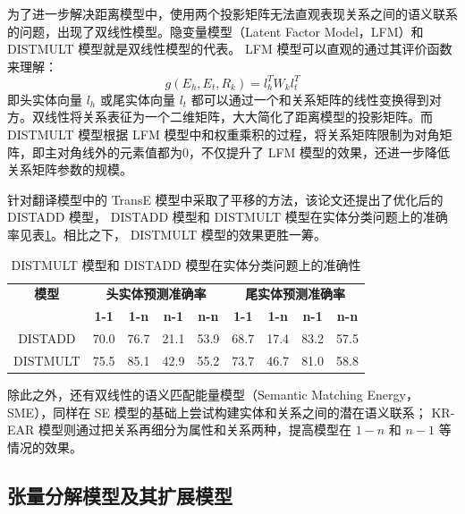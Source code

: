 \documentclass{llncs}
\begin{document}
为了进一步解决距离模型中，使用两个投影矩阵无法直观表现关系之间的语义联系的问题，出现了双线性模型。隐变量模型（Latent Factor Model，LFM）\cite{DBLP:conf/nips/JenattonRBO12}和 DISTMULT 模型\cite{DBLP:journals/corr/YangYHGD14a}就是双线性模型的代表。 LFM 模型可以直观的通过其评价函数来理解：
\begin{displaymath}
g(E_h,E_t,R_k)=l_h^TW_kl_t^T
\end{displaymath}
即头实体向量 $l_h$ 或尾实体向量 $l_t$ 都可以通过一个和关系矩阵的线性变换得到对方。双线性将关系表征为一个二维矩阵，大大简化了距离模型的投影矩阵。而 DISTMULT 模型根据 LFM 模型中和权重乘积的过程，将关系矩阵限制为对角矩阵，即主对角线外的元素值都为0，不仅提升了 LFM 模型的效果，还进一步降低关系矩阵参数的规模。

针对翻译模型中的 TransE 模型\cite{DBLP:conf/nips/BordesUGWY13}中采取了平移的方法，该论文还提出了优化后的 DISTADD 模型\cite{DBLP:journals/corr/YangYHGD14a}， DISTADD 模型和 DISTMULT 模型在实体分类问题上的准确率见表\ref{tb:DISTMULT&DISTADD}。相比之下， DISTMULT 模型的效果更胜一筹。

\begin{table}
	\centering
	\caption{ DISTMULT 模型和 DISTADD 模型在实体分类问题上的准确性}
	\label{tb:DISTMULT&DISTADD}
	\begin{threeparttable}
		\begin{tabular}{ccccccccc}
			\hline
			\textbf{模型} & \multicolumn{4}{c}{\textbf{头实体预测准确率}} & \multicolumn{4}{c}{\textbf{尾实体预测准确率}} \\
			\textbf{} & \textbf{1-1} & \textbf{1-n} & \textbf{n-1} & \textbf{n-n} & \textbf{1-1} & \textbf{1-n} & \textbf{n-1} & \textbf{n-n} \\ \hline
			DISTADD & 70.0 & 76.7 & 21.1 & 53.9 & 68.7 & 17.4 & 83.2 & 57.5 \\
			DISTMULT & 75.5 & 85.1 & 42.9 & 55.2 & 73.7 & 46.7 & 81.0 & 58.8 \\ \hline
		\end{tabular}
	\end{threeparttable}
\end{table}

除此之外，还有双线性的语义匹配能量模型（Semantic Matching Energy，SME）\cite{DBLP:journals/jmlr/BordesGWB12}，同样在 SE 模型的基础上尝试构建实体和关系之间的潜在语义联系； KR-EAR 模型\cite{DBLP:conf/ijcai/LinLS16}则通过把关系再细分为属性和关系两种，提高模型在 $1-n$ 和 $n-1$ 等情况的效果。

\subsection{张量分解\cite{harshman1994parafac}模型及其扩展模型}
\end{document}
